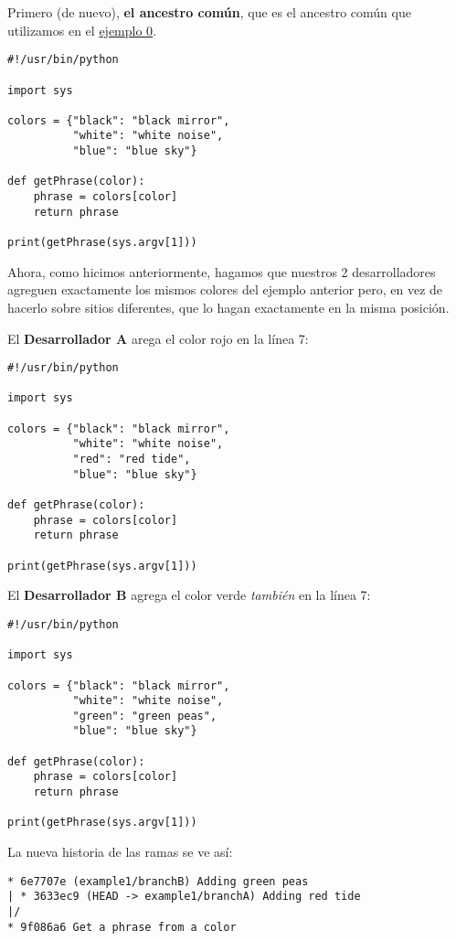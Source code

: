 Primero (de nuevo), {\bf el ancestro común}, que es el ancestro común que utilizamos en el \hyperref[example_00]{ejemplo 0}.
\begin{lstlisting}[style=python_style, caption={\bf Ejemplo 1} - ancestro común]
#!/usr/bin/python

import sys

colors = {"black": "black mirror",
          "white": "white noise",
          "blue": "blue sky"}

def getPhrase(color):
    phrase = colors[color]
    return phrase

print(getPhrase(sys.argv[1]))
\end{lstlisting}

Ahora, como hicimos anteriormente, hagamos que nuestros 2 desarrolladores agreguen exactamente los mismos colores del
ejemplo anterior pero, en vez de hacerlo sobre sitios diferentes, que lo hagan exactamente en la misma posición.

El {\bf Desarrollador A} arega el color rojo en la línea 7:
\begin{lstlisting}[style=python_style, caption={\bf Ejemplo 1} - Desarrollador A]
#!/usr/bin/python

import sys

colors = {"black": "black mirror",
          "white": "white noise",
          "red": "red tide",
          "blue": "blue sky"}

def getPhrase(color):
    phrase = colors[color]
    return phrase

print(getPhrase(sys.argv[1]))
\end{lstlisting}

El {\bf Desarrollador B} agrega el color verde {\it también} en la línea 7:
\begin{lstlisting}[style=python_style, caption={\bf Ejemplo 1} - Desarrollador B]
#!/usr/bin/python

import sys

colors = {"black": "black mirror",
          "white": "white noise",
          "green": "green peas",
          "blue": "blue sky"}

def getPhrase(color):
    phrase = colors[color]
    return phrase

print(getPhrase(sys.argv[1]))
\end{lstlisting}

La nueva historia de las ramas se ve así:
\begin{lstlisting}[style=branch_history_style, caption={\bf Ejemplo 1} - historia de las ramas]
* 6e7707e (example1/branchB) Adding green peas
| * 3633ec9 (HEAD -> example1/branchA) Adding red tide
|/  
* 9f086a6 Get a phrase from a color
\end{lstlisting}

